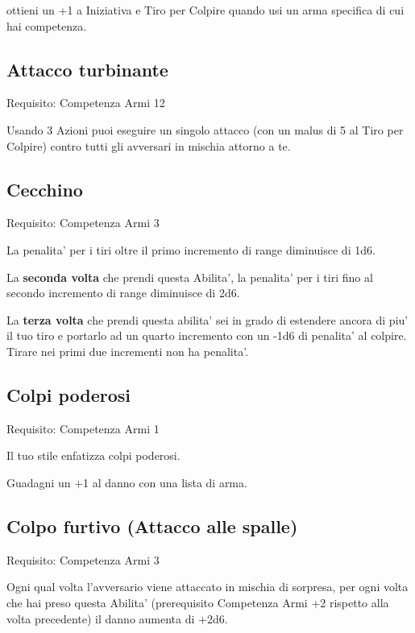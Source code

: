 \documentclass[a4paper,11pt,twoside,openany]{book}
\begin{document}
	ottieni un +1 a Iniziativa e Tiro per Colpire quando usi un arma specifica
	di cui hai competenza.
	
	\subsection{Attacco turbinante}
	
	Requisito: Competenza Armi 12
	
	Usando 3 Azioni puoi eseguire un singolo attacco (con un malus di
	5 al Tiro per Colpire) contro tutti gli avversari in mischia attorno
	a te.
	
	\subsection{Cecchino}
	
	Requisito: Competenza Armi 3
	
	La penalita' per i tiri oltre il primo incremento di range diminuisce
	di 1d6.
	
	La \textbf{seconda volta} che prendi questa Abilita', la penalita'
	per i tiri fino al secondo incremento di range diminuisce di 2d6.
	
	La \textbf{terza volta} che prendi questa abilita' sei in grado di
	estendere ancora di piu' il tuo tiro e portarlo ad un quarto incremento
	con un -1d6 di penalita' al colpire. Tirare nei primi due incrementi
	non ha penalita'.
	
	\subsection{Colpi poderosi}
	
	Requisito: Competenza Armi 1
	
	Il tuo stile enfatizza colpi poderosi.
	
	Guadagni un +1 al danno con una lista di arma.
	
	\subsection{Colpo furtivo (Attacco alle spalle)}
	
	Requisito: Competenza Armi 3
	
	Ogni qual volta l'avversario viene attaccato in mischia di sorpresa,
	per ogni volta che hai preso questa Abilita' (prerequisito Competenza
	Armi +2 rispetto alla volta precedente) il danno aumenta di +2d6.
	
\end{document}
